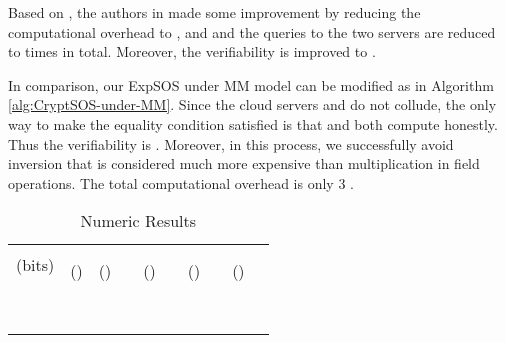 \documentclass[english,draftcls,onecolumn,11pt]{IEEEtran}
\providecommand{\tabularnewline}{\\}
\theoremstyle{definition}
\theoremstyle{plain}
\theoremstyle{plain}
\theoremstyle{definition}
\begin{document}
Based on \cite{hohenberger2005securely}, the authors in \cite{chen2012new}
made some improvement by reducing the computational overhead to 
,   and  and the queries to
the two servers are reduced to  times in total. Moreover, the
verifiability is improved to .

In comparison, our ExpSOS under MM model can be modified as in Algorithm
\ref{alg:CryptSOS-under-MM}. Since the cloud servers  and
 do not collude, the only way to make the equality condition
satisfied is that  and  both compute honestly. Thus
the verifiability is . Moreover, in this process, we successfully
avoid inversion that is considered much more expensive than multiplication
in field operations. The total computational overhead is only 3 . 

\begin{table*}
\caption{Numeric Results\label{tab:Numeric-Results}}


\centering{}\begin{tabular}{|c|c|c|c|c|c|c|c|c|c|}
\hline 
\multirow{3}{*}{(bits)} & \multicolumn{9}{c|}{}\tabularnewline
\cline{2-10} 
 & \multicolumn{3}{c|}{} & \multicolumn{2}{c|}{} & \multicolumn{2}{c|}{} & \multicolumn{2}{c|}{}\tabularnewline
\cline{2-10} 
 &  () &  () &  &  () &  &  () &  &  () & \tabularnewline
\hline 
 &  &  &  &  &  &  &  &  & \tabularnewline
\hline 
 &  &  &  &  &  &  &  &  & \tabularnewline
\hline 
 &  &  &  &  &  &  &  &  & \tabularnewline
\hline 
 &  &  &  &  &  &  &  &  & \tabularnewline
\hline 
 &  &  &  &  &  &  &  &  & \tabularnewline
\hline 
 &  &  &  &  &  &  &  &  & \tabularnewline
\hline 
 &  &  &  &  &  &  &  &  & \tabularnewline
\hline 
 &  &  &  &  &  &  &  &  & \tabularnewline
\hline 
\end{tabular}
\end{table*}
\end{document}
